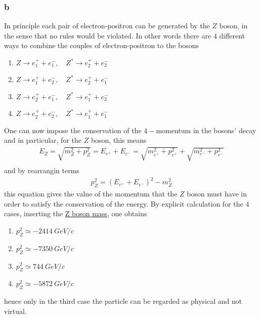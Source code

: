 \subsubsection*{b}
In principle each pair of electron-positron can be generated by the $Z$ boson, in the sense that no rules would be violated. 
In other words there are $4$ different ways to combine the couples of electron-positron to the bosons
\begin{enumerate}
    \item $Z \rightarrow e^+_1 + e^-_1, \quad Z^* \rightarrow e^+_2 + e^-_2$
    \item $Z \rightarrow e^+_1 + e^-_2, \quad Z^* \rightarrow e^+_2 + e^-_1$ 
    \item $Z \rightarrow e^+_2 + e^-_1, \quad Z^* \rightarrow e^+_1 + e^-_2$
    \item $Z \rightarrow e^+_2 + e^-_2, \quad Z^* \rightarrow e^+_1 + e^-_1$
\end{enumerate}
One can now impose the conservation of the $4-$momentum in the bosons' decay and in particular, for the $Z$ boson, this means 
\begin{gather*}
    E_Z = \sqrt{m_Z^2 + p_Z^2} = E_{e^+} + E_{e^-} = \sqrt{m_{e^+}^2 + p_{e^+}^2} + \sqrt{m_{e^-}^2 + p_{e^-}^2} \\
\end{gather*}
and by rearrangin terms
\begin{gather*}
    p_Z^2 = (E_{e^+} + E_{e^-})^2 - m_Z^2
\end{gather*}
this equation gives the value of the momentum that the $Z$ boson must have in order to satisfy the conservation of the energy.
By explicit calculation for the $4$ cases, inserting the \href{https://en.wikipedia.org/wiki/W_and_Z_bosons}{Z boson mass}, one obtains 
\begin{enumerate}
    \item $p_Z^2 \simeq -2414~GeV/c$
    \item $p_Z^2 \simeq -7350~GeV/c$
    \item $p_Z^2 \simeq 744~GeV/c$
    \item $p_Z^2 \simeq  -5872~GeV/c$
\end{enumerate}
hence only in the third case the particle can be regarded as physical and not virtual.

